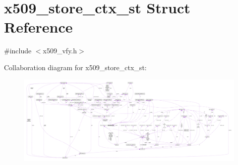 \hypertarget{structx509__store__ctx__st}{}\section{x509\+\_\+store\+\_\+ctx\+\_\+st Struct Reference}
\label{structx509__store__ctx__st}


{\ttfamily \#include $<$x509\+\_\+vfy.\+h$>$}



Collaboration diagram for x509\+\_\+store\+\_\+ctx\+\_\+st\+:\nopagebreak
\begin{figure}[H]
\begin{center}
\leavevmode
\includegraphics[width=350pt]{structx509__store__ctx__st__coll__graph}
\end{center}
\end{figure}
